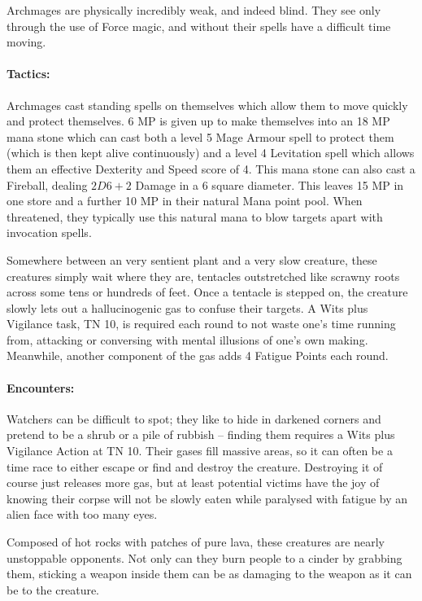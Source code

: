 Archmages are physically incredibly weak, and indeed blind.  They see only through the use of Force magic, and without their spells have a difficult time moving.

\paragraph{Tactics:} Archmages cast standing spells on themselves which allow them to move quickly and protect themselves.  6 MP is given up to make themselves into an 18 MP mana stone which can cast both a level 5 Mage Armour spell to protect them (which is then kept alive continuously) and a level 4 Levitation spell which allows them an effective Dexterity and Speed score of 4.  This mana stone can also cast a Fireball, dealing $2D6+2$ Damage in a 6 square diameter.  This leaves 15 MP in one store and a further 10 MP in their natural Mana point pool.  When threatened, they typically use this natural mana to blow targets apart with invocation spells.

\label{watcher}
\watcher

Somewhere between an very sentient plant and a very slow creature, these creatures simply wait where they are, tentacles outstretched like scrawny roots across some tens or hundreds of feet.  Once a tentacle is stepped on, the creature slowly lets out a hallucinogenic gas to confuse their targets.  A Wits plus Vigilance task, TN 10, is required each round to not waste one's time running from, attacking or conversing with mental illusions of one's own making.  Meanwhile, another component of the gas adds 4 Fatigue Points each round.

\paragraph{Encounters:} Watchers can be difficult to spot; they like to hide in darkened corners and pretend to be a shrub or a pile of rubbish -- finding them requires a Wits plus Vigilance Action at TN 10.  Their gases fill massive areas, so it can often be a time race to either escape or find and destroy the creature.  Destroying it of course just releases more gas, but at least potential victims have the joy of knowing their corpse will not be slowly eaten while paralysed with fatigue by an alien face with too many eyes.

\label{lavaman}

\lavaman

Composed of hot rocks with patches of pure lava, these creatures are nearly unstoppable opponents.  Not only can they burn people to a cinder by grabbing them, sticking a weapon inside them can be as damaging to the weapon as it can be to the creature.

